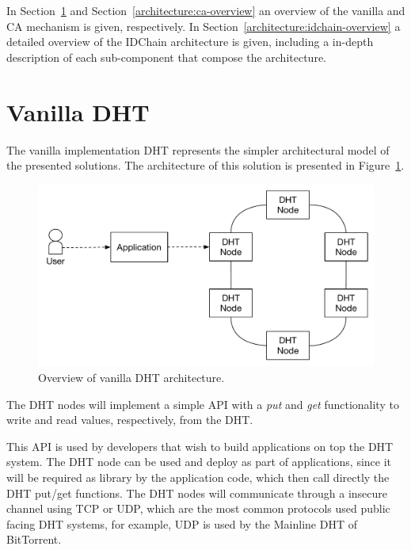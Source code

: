 In Section~\ref{architecture:vanilla-overview} and Section~\ref{architecture:ca-overview} an overview of the vanilla and \ac{CA} mechanism is given, respectively.
In Section~\ref{architecture:idchain-overview} a detailed overview of the IDChain architecture is given, including a in-depth description of each sub-component that compose the architecture.

\section{Vanilla DHT}\label{architecture:vanilla-overview}

The vanilla implementation DHT represents the simpler architectural model of the presented solutions.
The architecture of this solution is presented in Figure~\ref{fig:architecture-vanilla-overview}.

\begin{figure}[htb]
  \centering
  \includegraphics[scale=0.5]{Figures/architecture-overview-none.pdf}
  \caption{Overview of vanilla DHT architecture.}
\label{fig:architecture-vanilla-overview}
\end{figure}

The DHT nodes will implement a simple \ac{API} with a \textit{put} and \textit{get} functionality to write and read values, respectively, from the \ac{DHT}.

This \ac{API} is used by developers that wish to build applications on top the DHT system.
The DHT node can be used and deploy as part of applications, since it will be required as library by the application code, which then call directly the DHT put/get functions.
The \ac{DHT} nodes will communicate through a insecure channel using TCP or UDP, which are the most common protocols used public facing DHT systems, for example, UDP is used by the Mainline DHT of BitTorrent.

